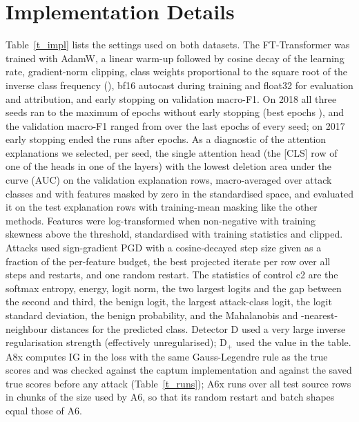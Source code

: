 \appendix
\section{Implementation Details}
\label{sec:appendix}

Table~\ref{t_impl} lists the settings used on both datasets.
The FT-Transformer was trained with AdamW, a linear warm-up followed by cosine decay of the learning rate, gradient-norm
clipping, class weights proportional to the square root of the inverse class frequency (\apClassWeight), bf16
autocast during training and float32 for evaluation and attribution, and early stopping on validation macro-F1.
On 2018 all three seeds ran to the maximum of \apMaxEpochs{} epochs without early stopping (best epochs
\apBestEpochEighteen), and the validation macro-F1 ranged from \valFlatEighteenRange{} over the last
\apPatience{} epochs of every seed; on 2017 early stopping ended the runs after \apEpochsRunSeventeen{} epochs.
As a diagnostic of the attention explanations we selected, per seed, the single attention head (the [CLS] row of one
of the \apHeads{} heads in one of the \apBlocks{} layers) with the lowest deletion area under the curve (AUC) on the
validation explanation rows, macro-averaged over attack classes and with features masked by zero in the standardised
space, and evaluated it on the test explanation rows with training-mean masking like the other methods.
Features were log-transformed when non-negative with training skewness above the threshold, standardised with training
statistics and clipped.
Attacks used sign-gradient PGD with a cosine-decayed step size given as a fraction of the per-feature budget, the best
projected iterate per row over all steps and restarts, and one random restart.
The \nConsistency{} statistics of control c2 are the softmax entropy, energy, logit norm, the two largest logits and the
gap between the second and third, the benign logit, the largest attack-class logit, the logit standard deviation, the
benign probability, and the Mahalanobis and \paramKnn{}-nearest-neighbour distances for the predicted class.
Detector D used a very large inverse regularisation strength (effectively unregularised); D$_+$ used the value in the
table.
A8x computes IG in the loss with the same Gauss-Legendre rule as the true scores and was checked against the captum
implementation and against the saved true scores before any attack (Table~\ref{t_runs}); A6x runs over all test source
rows in chunks of the size used by A6, so that its random restart and batch shapes equal those of A6.

